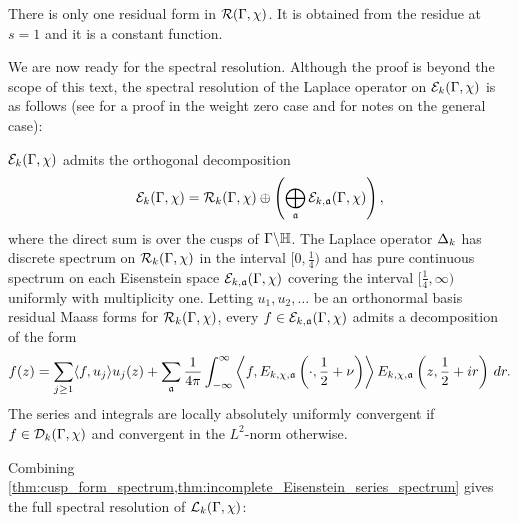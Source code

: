     \begin{proposition}\label{prop:residual_forms_weight_zero}
      There is only one residual form in $\mathcal{R}(\Gamma,\chi)$. It is obtained from the residue at $s = 1$ and it is a constant function.
    \end{proposition}

    We are now ready for the spectral resolution. Although the proof is beyond the scope of this text, the spectral resolution of the Laplace operator on $\mathcal{E}_{k}(\Gamma,\chi)$ is as follows (see \cite{iwaniec2002spectral} for a proof in the weight zero case and \cite{duke2002subconvexity} for notes on the general case):

    \begin{theorem}\label{thm:incomplete_Eisenstein_series_spectrum}
      $\mathcal{E}_{k}(\Gamma,\chi)$ admits the orthogonal decomposition
      \[
        \mathcal{E}_{k}(\Gamma,\chi) = \mathcal{R}_{k}(\Gamma,\chi) \oplus \left(\bigoplus_{\mathfrak{a}}\mathcal{E}_{k,\mathfrak{a}}(\Gamma,\chi)\right),
      \]
      where the direct sum is over the cusps of $\Gamma\backslash\mathbb{H}$. The Laplace operator $\Delta_{k}$ has discrete spectrum on $\mathcal{R}_{k}(\Gamma,\chi)$ in the interval $[0,\frac{1}{4})$ and has pure continuous spectrum on each Eisenstein space $\mathcal{E}_{k,\mathfrak{a}}(\Gamma,\chi)$ covering the interval $\big[\frac{1}{4},\infty\big)$ uniformly with multiplicity one. Letting $u_{1},u_{2},\ldots$ be an orthonormal basis residual Maass forms for $\mathcal{R}_{k}(\Gamma,\chi)$, every $f \in \mathcal{E}_{k,\mathfrak{a}}(\Gamma,\chi)$ admits a decomposition of the form
      \[
        f(z) = \sum_{j \ge 1}\langle f,u_{j}\rangle u_{j}(z)+\sum_{\mathfrak{a}}\frac{1}{4\pi}\int_{-\infty}^{\infty}\left\langle f,E_{k,\chi,\mathfrak{a}}\left(\cdot,\frac{1}{2}+\nu\right)\right\rangle E_{k,\chi,\mathfrak{a}}\left(z,\frac{1}{2}+ir\right)\,dr.
      \]
      The series and integrals are locally absolutely uniformly convergent if $f \in \mathcal{D}_{k}(\Gamma,\chi)$ and convergent in the $L^{2}$-norm otherwise.
    \end{theorem}

    Combining \cref{thm:cusp_form_spectrum,thm:incomplete_Eisenstein_series_spectrum} gives the full spectral resolution of $\mathcal{L}_{k}(\Gamma,\chi)$:

